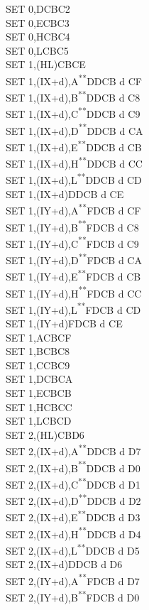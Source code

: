 \documentclass[12pt,twoside,openright,a4paper]{book}
\newcommand{\UNDOC}{\textnormal{\textsuperscript{**}}}
\begin{document}
\begin{multicols}{3}
{\begin{tabbing}
	SET 0,D\>CBC2\\
	SET 0,E\>CBC3\\
	SET 0,H\>CBC4\\
	SET 0,L\>CBC5\\
	SET 1,(HL)\>CBCE\\
	SET 1,(IX+d),A\UNDOC\>DDCB d CF\\
	SET 1,(IX+d),B\UNDOC\>DDCB d C8\\
	SET 1,(IX+d),C\UNDOC\>DDCB d C9\\
	SET 1,(IX+d),D\UNDOC\>DDCB d CA\\
	SET 1,(IX+d),E\UNDOC\>DDCB d CB\\
	SET 1,(IX+d),H\UNDOC\>DDCB d CC\\
	SET 1,(IX+d),L\UNDOC\>DDCB d CD\\
	SET 1,(IX+d)\>DDCB d CE\\
	SET 1,(IY+d),A\UNDOC\>FDCB d CF\\
	SET 1,(IY+d),B\UNDOC\>FDCB d C8\\
	SET 1,(IY+d),C\UNDOC\>FDCB d C9\\
	SET 1,(IY+d),D\UNDOC\>FDCB d CA\\
	SET 1,(IY+d),E\UNDOC\>FDCB d CB\\
	SET 1,(IY+d),H\UNDOC\>FDCB d CC\\
	SET 1,(IY+d),L\UNDOC\>FDCB d CD\\
	SET 1,(IY+d)\>FDCB d CE\\
	SET 1,A\>CBCF\\
	SET 1,B\>CBC8\\
	SET 1,C\>CBC9\\
	SET 1,D\>CBCA\\
	SET 1,E\>CBCB\\
	SET 1,H\>CBCC\\
	SET 1,L\>CBCD\\
	SET 2,(HL)\>CBD6\\
	SET 2,(IX+d),A\UNDOC\>DDCB d D7\\
	SET 2,(IX+d),B\UNDOC\>DDCB d D0\\
	SET 2,(IX+d),C\UNDOC\>DDCB d D1\\
	SET 2,(IX+d),D\UNDOC\>DDCB d D2\\
	SET 2,(IX+d),E\UNDOC\>DDCB d D3\\
	SET 2,(IX+d),H\UNDOC\>DDCB d D4\\
	SET 2,(IX+d),L\UNDOC\>DDCB d D5\\
	SET 2,(IX+d)\>DDCB d D6\\
	SET 2,(IY+d),A\UNDOC\>FDCB d D7\\
	SET 2,(IY+d),B\UNDOC\>FDCB d D0\\

\end{tabbing}}
\end{multicols}
\end{document}
